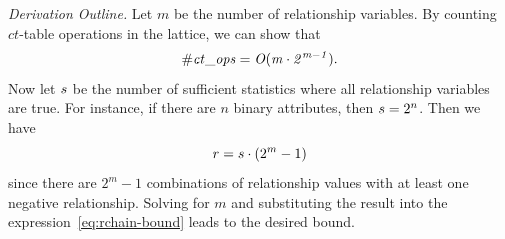 \documentclass{acm_proc_article-sp}
\newcommand{\ct}{\mathit{ct}}
\begin{document}
\emph{Derivation Outline.} Let $m$ be the  number of relationship variables. By counting $\ct$-table operations in the lattice, we can show that  
%
\begin{equation} \label{eq:rchain-bound}
\it{\# \ct\_\it{ops}} = O(m \cdot 2^{m-1}).
\end{equation}
%
Now let $s$ be the number of sufficient statistics where all relationship variables are true. For instance, if there are $n$ binary attributes, then $s = 2^{n}$. Then we have \begin{equation} \label{eq:row-stats} r = s \cdot (2^{m}-1) \end{equation} since there are $2^{m}-1$ combinations of relationship values with at least one negative relationship. Solving for $m$ and substituting the result into the expression~\eqref{eq:rchain-bound} leads to the desired bound.

\end{document}
